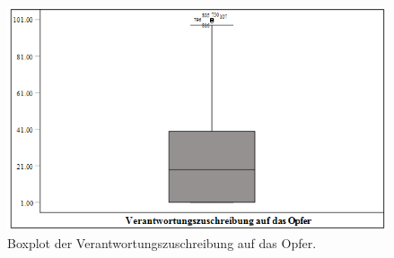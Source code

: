 \begin{figure}[htb]
    \centering
        \includegraphics[width=0.8\linewidth]{Box - VicBlame.png}
        \caption[Boxplot VicBlame]{Boxplot der Verantwortungszuschreibung auf das Opfer.}
        \label{Boxplot VicBlame}
\end{figure}

